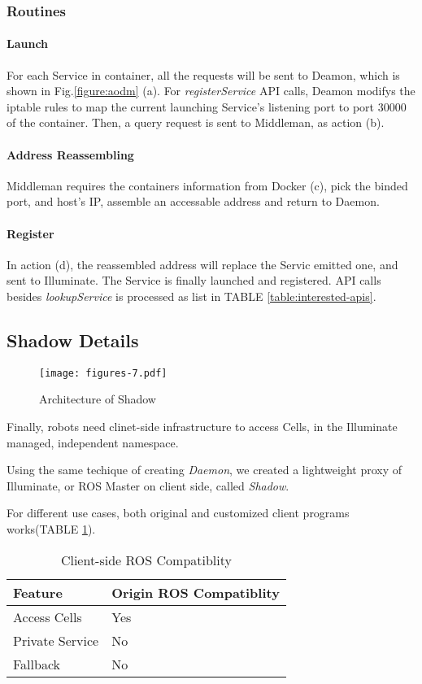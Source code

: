 \subsubsection{Routines}
\paragraph{Launch}
For each Service in container, all the requests will be sent to Deamon,
which is shown in Fig.\ref{figure:aodm} (a).
For \emph{registerService} API calls, Deamon modifys the iptable rules to
map the current launching Service's listening port to port 30000 of the container.
Then, a query request is sent to Middleman, as action (b).

\paragraph{Address Reassembling}
Middleman requires the containers information from Docker (c),
pick the binded port, and host's IP, assemble an accessable address and
return to Daemon. 

\paragraph{Register}
In action (d), the reassembled address will replace the Servic emitted one,
and sent to Illuminate.
The Service is finally launched and registered. API calls besides
\emph{lookupService} is processed as list in TABLE \ref{table:interested-apis}.

\subsection{Shadow Details}

\begin{figure}[!t]
\centering
\texttt{[image: figures-7.pdf]}
\caption{Architecture of Shadow}
\label{figure:aosh}
\end{figure}

Finally, robots need clinet-side infrastructure to access Cells,
in the Illuminate managed, independent namespace.

Using the same techique of creating \emph{Daemon}, we created a lightweight
proxy of Illuminate, or ROS Master on client side, called \emph{Shadow}.

For different use cases, both original and customized client programs
works(TABLE \ref{table:shadow-compatible}).

\begin{table}
  \caption{Client-side ROS Compatiblity}
  \label{table:shadow-compatible}
  \centering
  \begin{tabular}{ll}
    \hline
    \bfseries Feature & \bfseries Origin ROS Compatiblity \\
    \hline
    Access Cells    & Yes \\
    Private Service & No  \\
    Fallback        & No  \\
    \hline
  \end{tabular}
\end{table} 

